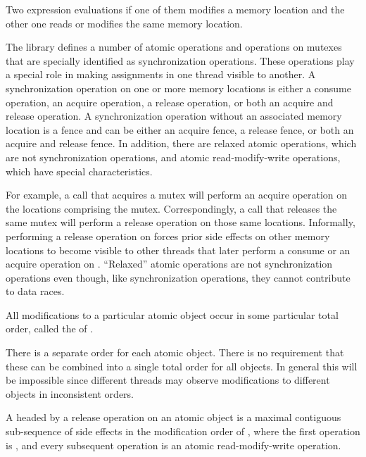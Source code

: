 \pnum
Two expression evaluations  if one of them modifies a memory
location and the other one reads or modifies the same
memory location.

\pnum
The library defines a number of atomic operations and
operations on mutexes that are specially identified as
synchronization operations. These operations play a special role in making
assignments in one thread visible to another. A synchronization operation on one
or more memory locations is either a consume operation, an acquire operation, a
release operation, or both an acquire and release operation. A synchronization
operation without an associated memory location is a fence and can be either an
acquire fence, a release fence, or both an acquire and release fence. In
addition, there are relaxed atomic operations, which are not synchronization
operations, and atomic read-modify-write operations, which have special
characteristics. \begin{note} For example, a call that acquires a mutex will
perform an acquire operation on the locations comprising the mutex.
Correspondingly, a call that releases the same mutex will perform a release
operation on those same locations. Informally, performing a release operation on
 forces prior
%
side effects on other memory locations to become visible
to other threads that later perform a consume or an acquire operation on
. ``Relaxed'' atomic operations are not synchronization operations even
though, like synchronization operations, they cannot contribute to data races.
\end{note}

\pnum
All modifications to a particular atomic object  occur in some
particular total order, called the  of .
\begin{note} There is a separate order for each
atomic object. There is no requirement that these can be combined into a single
total order for all objects. In general this will be impossible since different
threads may observe modifications to different objects in inconsistent orders.
\end{note}

\pnum
A  headed
by a release operation  on an atomic object 
is a maximal contiguous sub-sequence of
%
side effects in the modification order of ,
where the first operation is , and
every subsequent operation is an atomic read-modify-write operation.

